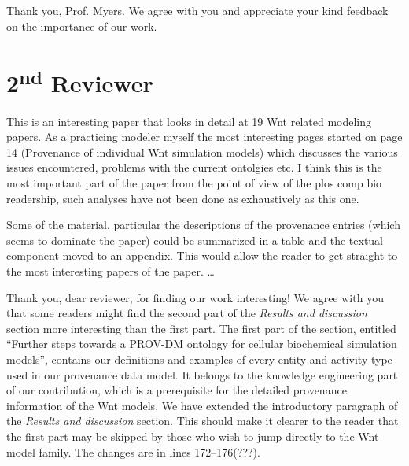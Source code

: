 \documentclass{article}
\begin{document}
Thank you, Prof. Myers. We agree with you and appreciate your kind feedback on the importance of our work.

\section*{2\textsuperscript{nd} Reviewer}
\begin{mdframed}
This is an interesting paper that looks in detail at 19 Wnt related modeling papers.
As a practicing modeler myself the most interesting pages started on page 14 (Provenance of individual Wnt simulation models) which discusses the various issues encountered, problems with the current ontolgies etc.
I think this is the most important part of the paper from the point of view of the plos comp bio readership, such analyses have not been done as exhaustively as this one.

Some of the material, particular the descriptions of the provenance entries (which seems to dominate the paper) could be summarized in a table and the textual component moved to an appendix. This would allow the reader to get straight to the most interesting papers of the paper. \ldots
\end{mdframed}

Thank you, dear reviewer, for finding our work interesting!
We agree with you that some readers might find the second part of the \textit{Results and discussion} section more interesting than the first part.
The first part of the section, entitled \enquote{Further steps towards a PROV-DM ontology for cellular biochemical simulation models}, contains our definitions and examples of every entity and activity type used in our provenance data model.
It belongs to the knowledge engineering part of our contribution, which is a prerequisite for the detailed provenance information of the Wnt models.
We have extended the introductory paragraph of the \textit{Results and discussion} section.
This should make it clearer to the reader that the first part may be skipped by those who wish to jump directly to the Wnt model family.
The changes are in lines 172--176(???).
\end{document}
